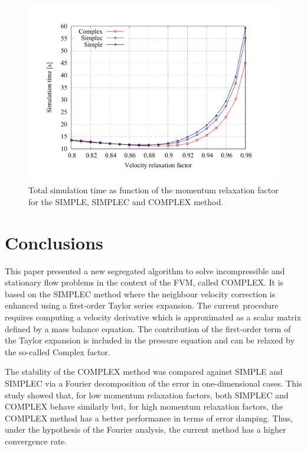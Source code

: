 \documentclass[final,3p,times,11pt,onecolumn]{myElsarticle}
\numberwithin{equation}{section}
\begin{document}
\begin{figure}[b!]
\centering
\includegraphics[width=13cm]{fig/Results/TimesBFS-coarse.pdf}
\caption{Total simulation time as function of the momentum relaxation factor for the SIMPLE, SIMPLEC and COMPLEX method.}
\label{Fig:TimesBFS}
\end{figure}

\section{Conclusions}
\label{sec:conclusions}
This paper presented a new segregated algorithm to solve incompressible and stationary flow problems in the context of the FVM, called COMPLEX. It is based on the SIMPLEC method where the neighbour velocity correction is enhanced using a first-order Taylor series expansion. The current procedure requires computing a velocity derivative which is approximated as a scalar matrix defined by a mass balance equation. The contribution of the first-order term of the Taylor expansion is included in the pressure equation and can be relaxed by the so-called Complex factor.

The stability of the COMPLEX method was compared against SIMPLE and SIMPLEC via a Fourier decomposition of the error in one-dimensional cases. This study showed that, for low momentum relaxation factors, both SIMPLEC and COMPLEX behave similarly but, for high momentum relaxation factors, the COMPLEX method has a better performance in terms of error damping. Thus, under the hypothesis of the Fourier analysis, the current method has a higher convergence rate.
\end{document}
